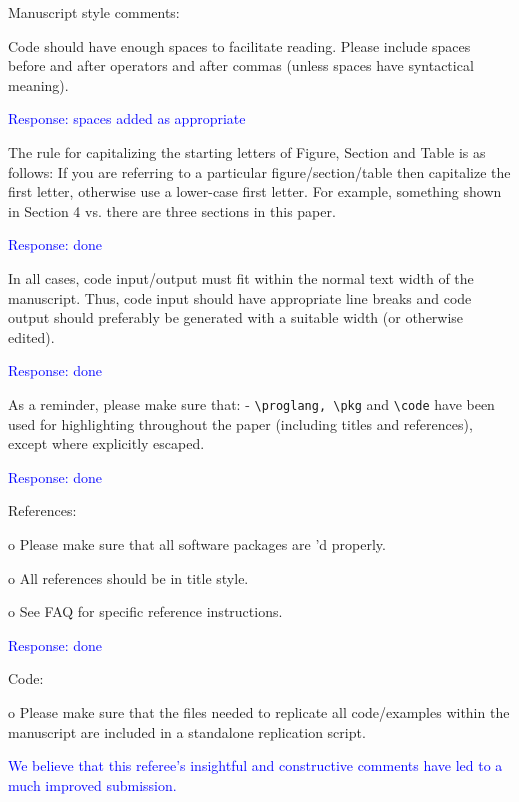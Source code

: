 \documentclass[12pt]{article}
\begin{document}
Manuscript style comments:

Code should have enough spaces to facilitate reading.  Please include
spaces before and after operators and after commas (unless spaces have
syntactical meaning).

\textcolor{blue}{Response: spaces added as appropriate}

The rule for capitalizing the starting letters of Figure, Section and
Table is as follows: If you are referring to a particular
figure/section/table then capitalize the first letter, otherwise use a
lower-case first letter. For example, something shown in Section 4
vs. there are three sections in this paper.

\textcolor{blue}{Response: done}

In all cases, code input/output must fit within the normal text
width of the manuscript.  Thus, code input should have appropriate
line breaks and code output should preferably be generated with a
suitable width (or otherwise edited).

\textcolor{blue}{Response: done}

As a reminder, please make sure that: - \verb+\proglang, \pkg+ and
\verb+\code+ have been used for highlighting throughout the paper
(including titles and references), except where explicitly escaped.

\textcolor{blue}{Response: done}

References:



o Please make sure that all software packages are \cite{}'d properly.

o All references should be in title style.

o See FAQ for specific reference instructions.


\textcolor{blue}{Response: done}

Code:

o Please make sure that the files needed to replicate all
code/examples within the manuscript are included in a standalone
replication script.


\textcolor{blue}{We believe that this referee's insightful and
  constructive comments have led to a much improved submission.}
\end{document}
